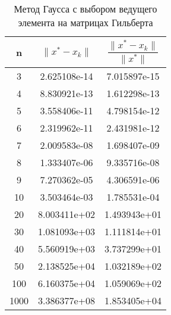 \documentclass[a4paper,12pt]{article}
\begin{document}
\begin{table}[]
\centering
\caption{Метод Гаусса с выбором ведущего элемента на матрицах Гильберта}
\begin{tabular}{|c|c|c|}
\hline
\rowcolor[HTML]{EED4E3} 
n     & $\|x^* - x_k\|$            & $\dfrac{\|x^* - x_k\|}{\|x^*\|}$           \\ \hline
\rowcolor[HTML]{F5E5E7} 
3    & 2.625108e-14                                              & 7.015897e-15 \\ \hline
\rowcolor[HTML]{F5E5E7} 
4    & 8.830921e-13                                              & 1.612298e-13 \\ \hline
\rowcolor[HTML]{F5E5E7} 
5    & 3.558406e-11                                              & 4.798154e-12 \\ \hline
\rowcolor[HTML]{F5E5E7} 
6    & 2.319962e-11                                              & 2.431981e-12 \\ \hline
\rowcolor[HTML]{F5E5E7} 
7    & 2.009583e-08                                              & 1.698407e-09 \\ \hline
\rowcolor[HTML]{F5E5E7} 
8    & 1.333407e-06                                              & 9.335716e-08 \\ \hline
\rowcolor[HTML]{F5E5E7} 
9    & 7.270362e-05                                              & 4.306591e-06 \\ \hline
\rowcolor[HTML]{F5E5E7} 
10   & 3.503464e-03                                              & 1.785531e-04 \\ \hline
\rowcolor[HTML]{F5E5E7} 
20   & 8.003411e+02                                              & 1.493943e+01 \\ \hline
\rowcolor[HTML]{F5E5E7} 
30   & 1.081093e+03                                              & 1.111814e+01 \\ \hline
\rowcolor[HTML]{F5E5E7} 
40   & 5.560919e+03                                              & 3.737299e+01 \\ \hline
\rowcolor[HTML]{F5E5E7} 
50   & 2.138525e+04                                              & 1.032189e+02 \\ \hline
\rowcolor[HTML]{F5E5E7} 
100  & 6.160375e+04                                              & 1.059069e+02 \\ \hline
\rowcolor[HTML]{F5E5E7} 
1000 & 3.386377e+08                                              & 1.853405e+04 \\ \hline
\end{tabular}
\end{table}
\end{document}
